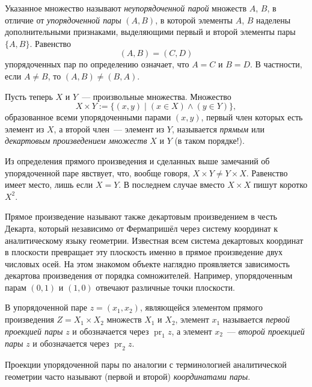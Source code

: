 Указанное множество называют \emph{неупорядоченной парой} множеств $A$, $B$, в отличие от \emph{упорядоченной пары\/} $(A, B)$, в которой элементы $A$, $B$ наделены дополнительными признаками, выделяющими первый и второй элементы пары $\{A, B\}$. Равенство
\[
(A, B) = (C, D)
\]
упорядоченных пар по определению означает, что $A = C$ и $B = D$. В частности, если $A \neq B$, то $(A, B) \neq (B, A)$.

Пусть теперь $X$ и $Y$~--- произвольные множества. Множество
\[
X \times Y := \{(x, y) \mid (x \in X) \land (y \in Y)\},
\]
образованное всеми упорядоченными парами $(x, y)$, первый член которых есть элемент из $X$, а второй член~--- элемент из $Y$, называется \emph{прямым} или \emph{декартовым произведением множеств} $X$ и $Y$ (в таком порядке!).

Из определения прямого произведения и сделанных выше замечаний об упорядоченной паре явствует, что, вообще говоря, $X \times Y \neq Y \times X$. Равенство имеет место, лишь если $X = Y$. В последнем случае вместо $X \times X$ пишут коротко $X^2$.

Прямое произведение называют также декартовым произведением в честь Декарта\footnotemark[1], который независимо от Ферма\footnotemark[2] пришёл через систему координат к аналитическому языку геометрии. Известная всем система декартовых координат в плоскости превращает эту плоскость именно в прямое произведение двух числовых осей. На этом знакомом объекте наглядно проявляется зависимость декартова произведения от порядка сомножителей. Например, упорядоченным парам $(0, 1)$ и $(1, 0)$ отвечают различные точки плоскости.



В упорядоченной паре $z = (x_1, x_2)$, являющейся элементом прямого произведения $Z = X_1 \times X_2$ множеств $X_1$ и $X_2$, элемент $x_1$ называется \emph{первой проекцией пары} $z$ и обозначается через $\operatorname{pr}_1 z$, а элемент $x_2$~--- \emph{второй проекцией пары} $z$ и обозначается через $\operatorname{pr}_2 z$.

Проекции упорядоченной пары по аналогии с терминологией аналитической геометрии часто называют (первой и второй) \emph{координатами пары}.

